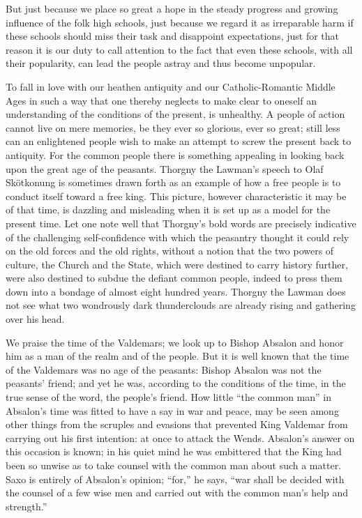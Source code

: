 \documentclass[12pt,a4paper,openany]{book}
\newcommand{\opage}[1]{\marginnote{\footnotesize\textit{[#1]}}}
\newcounter{lect}
\begin{document}
But just because we place so great a hope in the
steady progress and growing influence of the folk high schools,
just because we regard it as irreparable harm if
these schools should miss their task and disappoint
expectations, just for that reason it is our duty to call
\setcounter{footnote}{0}%
\opage{135}attention to the fact that even these schools, with all their
popularity, can lead the people astray and thus become
unpopular.

To fall in love with our heathen antiquity and our Catholic-Romantic
Middle Ages in such a way that one
thereby neglects to make clear to oneself an understanding of the conditions
of the present, is unhealthy. A people of action cannot
live on mere memories, be they ever so glorious,
ever so great; still less can an enlightened people wish
to make an attempt to screw the present back to antiquity.
For the common people there is something appealing in looking
back upon the great age of the peasants. Thorgny the Lawman's
speech to Olaf Skötkonung is sometimes drawn
forth as an example of how a free people is to
conduct itself toward a free king. This picture,
however characteristic it may be of that time, is dazzling
and misleading when it is set up as a model
for the present time. Let one note well
that Thorgny's bold words are precisely indicative
of the challenging self-confidence with which the peasantry
thought it could rely on the old forces and the
old rights, without a notion that the two powers of culture,
the Church and the State, which were destined to
carry history further, were also destined to subdue
the defiant common people, indeed to press them down into a bondage of almost
eight hundred years. Thorgny the Lawman does not see
what two wondrously dark thunderclouds
are already rising and gathering over his
head.

We praise the time of the Valdemars; we look up to Bishop
Absalon and honor him as a man of the realm and of the people.
But it is well known that the time of the Valdemars was
\setcounter{footnote}{0}%
\opage{136}no age of the peasants: Bishop Absalon was not the peasants'
friend; and yet he was, according to the conditions of the time, in the
true sense of the word, the people's friend. How little ``the common
man'' in Absalon's time was fitted to have a say
in war and peace, may be seen among other things from
the scruples and evasions that prevented King
Valdemar from carrying out his first intention: at once to attack
the Wends. Absalon's answer on this occasion is
known; in his quiet mind he was embittered that
the King had been so unwise as to take counsel
with the common man about such a matter. Saxo is entirely of
Absalon's opinion; ``for,'' he says, ``war shall be decided
with the counsel of a few wise men and carried out with the common
man's help and strength.''
\end{document}
